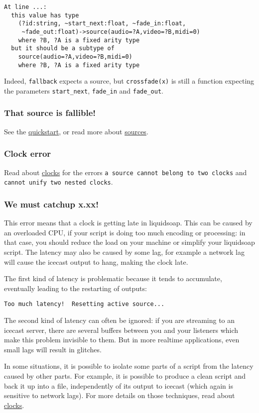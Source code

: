 \begin{verbatim}
At line ...:
  this value has type
    (?id:string, ~start_next:float, ~fade_in:float,
     ~fade_out:float)->source(audio=?A,video=?B,midi=0)
    where ?B, ?A is a fixed arity type
  but it should be a subtype of
    source(audio=?A,video=?B,midi=0)
    where ?B, ?A is a fixed arity type
\end{verbatim}
Indeed, \verb+fallback+ expects a source, but \verb+crossfade(x)+ is still a
function expecting the parameters \verb+start_next+, \verb+fade_in+ and
\verb+fade_out+.

\subsubsection{That source is fallible!}
See the \href{quick_start.html}{quickstart}, or read more about
\href{sources.html}{sources}.

\subsubsection{Clock error}
Read about \href{clocks.html}{clocks} for the errors
\verb+a source cannot belong to two clocks+ and
\verb+cannot unify two nested clocks+.

\subsubsection{We must catchup x.xx!}
This error means that a clock is getting late in liquidsoap. This can be caused
by an overloaded CPU, if your script is doing too much encoding or processing:
in that case, you should reduce the load on your machine or simplify your
liquidsoap script. The latency may also be caused by some lag, for example a
network lag will cause the icecast output to hang, making the clock late.

The first kind of latency is problematic because it tends to accumulate,
eventually leading to the restarting of outputs:
\begin{verbatim}
Too much latency!  Resetting active source...
\end{verbatim}

The second kind of latency can often be ignored: if you are streaming to an
icecast server, there are several buffers between you and your listeners which
make this problem invisible to them. But in more realtime applications, even
small lags will result in glitches.

In some situations, it is possible to isolate some parts of a script from the
latency caused by other parts. For example, it is possible to produce a clean
script and back it up into a file, independently of its output to icecast (which
again is sensitive to network lags).  For more details on those techniques, read
about \href{clocks.html}{clocks}.

